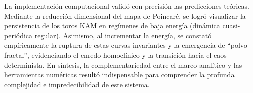 \documentclass[13pt]{extarticle}
\begin{document}
La implementación computacional validó con precisión las predicciones teóricas. Mediante la reducción dimensional del mapa de Poincaré, se logró visualizar la persistencia de los toros KAM en regímenes de baja energía (dinámica cuasi-periódica regular). Asimismo, al incrementar la energía, se constató empíricamente la ruptura de estas curvas invariantes y la emergencia de ``polvo fractal'', evidenciando el enredo homoclínico y la transición hacia el caos determinista. En síntesis, la complementariedad entre el marco analítico y las herramientas numéricas resultó indispensable para comprender la profunda complejidad e impredecibilidad de este sistema.
\end{document}
